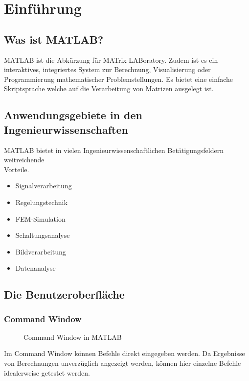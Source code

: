 \section{Einführung}
        \subsection{Was ist MATLAB?}
        MATLAB ist die Abkürzung für MATrix LABoratory. Zudem ist es ein interaktives, integriertes System zur Berechnung, Visualisierung oder Programmierung mathematischer Problemstellungen. Es bietet eine einfache Skriptsprache welche auf die Verarbeitung von Matrizen ausgelegt ist.
        \subsection{Anwendungsgebiete in den Ingenieurwissenschaften}
        MATLAB bietet in vielen Ingenieurwissenschaftlichen Betätigungsfeldern weitreichende \\Vorteile.
        \begin{itemize}
            \item Signalverarbeitung
            \item Regelungstechnik
            \item FEM-Simulation
            \item Schaltungsanalyse
            \item Bildverarbeitung
            \item Datenanalyse
        \end{itemize}
        \subsection{Die Benutzeroberfläche}
            \subsubsection*{Command Window}
                \begin{figure}[H]
                    \centering
                    \caption{Command Window in MATLAB}
                \end{figure}
                Im Command Window können Befehle direkt eingegeben werden. Da Ergebnisse von Berechnungen unverzüglich angezeigt werden, können hier einzelne Befehle idealerweise getestet werden.

